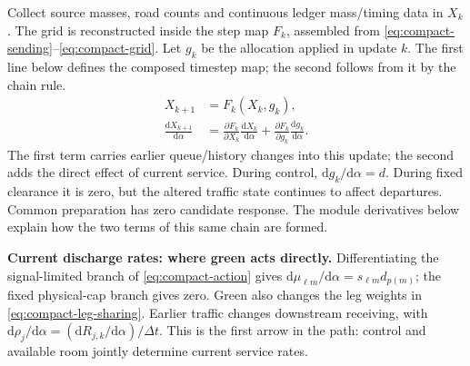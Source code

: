 \documentclass[10pt,a4paper]{article}
\newcommand{\rev}[1]{{\color{revisionred}#1}}
\begin{document}
Collect source masses, road counts and continuous ledger mass/timing data
in $X_k$. The grid is reconstructed inside the step map $F_k$, assembled
from \eqref{eq:compact-sending}--\eqref{eq:compact-grid}.
Let $g_k$ be the allocation applied in update $k$.
\rev{The first line below defines the composed timestep map; the second follows from it by the chain rule.}
\begin{equation}
 \begin{aligned}
 X_{k+1}&=F_k(X_k,g_k),\\
 \frac{\mathrm dX_{k+1}}{\mathrm d\alpha}
 &=\frac{\partial F_k}{\partial X_k}
       \frac{\mathrm dX_k}{\mathrm d\alpha}
  +\frac{\partial F_k}{\partial g_k}
       \frac{\mathrm dg_k}{\mathrm d\alpha}.
 \end{aligned}
 \label{eq:compact-chain}
\end{equation}
The first term carries earlier queue/history changes into this update;
the second adds the direct effect of current service. During control,
$\mathrm dg_k/\mathrm d\alpha=d$. During fixed clearance it is zero,
but the altered traffic state continues to affect departures.
Common preparation has zero candidate response. The module derivatives
below explain how the two terms of this same chain are formed.

\textbf{Current discharge rates: where green acts directly.}
Differentiating the signal-limited branch of \eqref{eq:compact-action}
gives $\mathrm d\mu_{\ell m}/\mathrm d\alpha=s_{\ell m}d_{p(m)}$;
the fixed physical-cap branch gives zero. Green also changes the leg
weights in \eqref{eq:compact-leg-sharing}. Earlier traffic changes
downstream receiving, with
$\mathrm d\rho_j/\mathrm d\alpha=(\mathrm dR_{j,k}/\mathrm d\alpha)/\Delta t$.
This is the first arrow in the path: control and available room jointly
determine current service rates.
\end{document}
